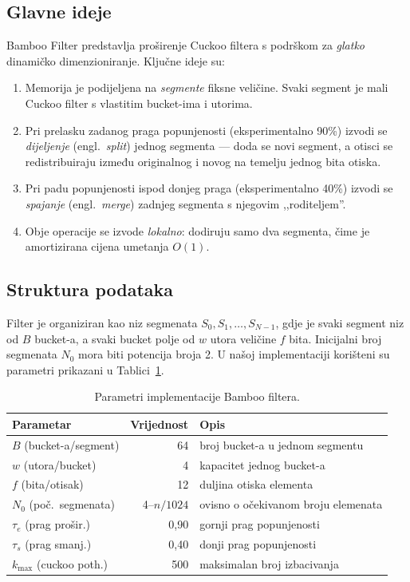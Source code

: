 \documentclass[12pt,a4paper]{article}
\begin{document}
\subsection{Glavne ideje}
Bamboo Filter \cite{wang2022bamboo} predstavlja proširenje Cuckoo filtera s podrškom
za \emph{glatko} dinamičko dimenzioniranje. Ključne ideje su:
\begin{enumerate}
    \item Memorija je podijeljena na \emph{segmente} fiksne veličine. Svaki segment je
          mali Cuckoo filter s vlastitim bucket-ima i utorima.
    \item Pri prelasku zadanog praga popunjenosti (eksperimentalno 90\%) izvodi se
          \emph{dijeljenje} (engl.~\textit{split}) jednog segmenta --- doda se novi
          segment, a otisci se redistribuiraju između originalnog i novog na temelju
          jednog bita otiska.
    \item Pri padu popunjenosti ispod donjeg praga (eksperimentalno 40\%) izvodi se
          \emph{spajanje} (engl.~\textit{merge}) zadnjeg segmenta s njegovim
          ,,roditeljem''.
    \item Obje operacije se izvode \emph{lokalno}: dodiruju samo dva segmenta, čime je
          amortizirana cijena umetanja $O(1)$.
\end{enumerate}

\subsection{Struktura podataka}
\label{sec:struktura}
Filter je organiziran kao niz segmenata $S_0, S_1, \ldots, S_{N-1}$, gdje je svaki
segment niz od $B$ bucket-a, a svaki bucket polje od $w$ utora veličine $f$ bita.
Inicijalni broj segmenata $N_0$ mora biti potencija broja 2. U našoj implementaciji
korišteni su parametri prikazani u Tablici~\ref{tab:parametri}.

\begin{table}[H]
    \centering
    \caption{Parametri implementacije Bamboo filtera.}
    \label{tab:parametri}
    \begin{tabular}{lrl}
        \toprule
        \textbf{Parametar} & \textbf{Vrijednost} & \textbf{Opis} \\
        \midrule
        $B$ (bucket-a/segment) & 64 & broj bucket-a u jednom segmentu \\
        $w$ (utora/bucket)     & 4  & kapacitet jednog bucket-a \\
        $f$ (bita/otisak)      & 12 & duljina otiska elementa \\
        $N_0$ (poč.~segmenata) & 4--$n/1024$ & ovisno o očekivanom broju elemenata \\
        $\tau_e$ (prag prošir.) & 0{,}90 & gornji prag popunjenosti \\
        $\tau_s$ (prag smanj.)  & 0{,}40 & donji prag popunjenosti \\
        $k_{\max}$ (cuckoo poth.) & 500 & maksimalan broj izbacivanja \\
        \bottomrule
    \end{tabular}
\end{table}
\end{document}
